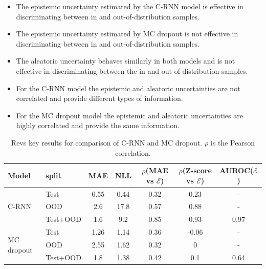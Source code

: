 \begin{itemize}
    \item The epistemic uncertainty estimated by the C-RNN model is effective in discriminating between in and out-of-distribution samples.
    
    \item The epistemic uncertainty estimated by MC dropout is not effective in discriminating between in and out-of-distribution samples.
    
    \item The aleatoric uncertainty behaves similarly in both models and is not effective in discriminating between the in and out-of-distribution samples.
    
    \item For the C-RNN model the epistemic and aleatoric uncertainties are not correlated and provide different types of information.
    
    \item For the MC dropout model the epistemic and aleatoric uncertainties are highly correlated and provide the same information. 
\end{itemize}{}


\begin{table}[htbp]
\centering
    \begin{tabular}{l l c c c c c}  
        \toprule
        Model & split & MAE & NLL & $\rho$(MAE vs $\mathcal{E}$) &
        $\rho$(Z-score vs $\mathcal{E}$) & AUROC($\mathcal{E}$)\\
        \midrule
        \multirow{3}{*}{C-RNN} 
            & Test     & 0.55& 0.44 & 0.32  & 0.23 & - \\  
            & OOD      & 2.6 & 17.8 & 0.57  & 0.88 & -\\  
            & Test+OOD & 1.6 & 9.2  & 0.85  & 0.93 & 0.97\\ 

        \midrule
        \multirow{3}{*}{MC dropout} 
            & Test     & 1.26 & 1.14  & 0.36  & -0.06 & - \\  
            & OOD      & 2.55 & 1.62  & 0.32  & 0 & -\\  
            & Test+OOD & 1.8  & 1.38  & 0.42  & 0.1 & 0.64\\ 

        \toprule
    \end{tabular}
    \caption{Revs key results for comparison of C-RNN and MC dropout. $\rho$ is the Pearson correlation.}
    \label{tbl:revs_comparison}
\end{table}


